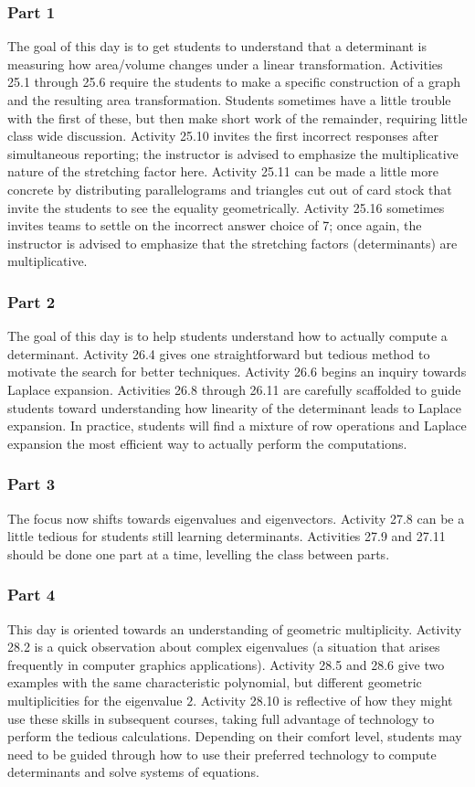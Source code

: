 \documentclass{article}
\begin{document}
\subsubsection*{Part 1}
The goal of this day is to get students to understand that a determinant is measuring how area/volume changes under a linear transformation.  Activities 25.1 through 25.6 require the students to make a specific construction of a graph and the resulting area transformation.  Students sometimes have a little trouble with the first of these, but then make short work of the remainder, requiring little class wide discussion.  Activity 25.10 invites the first incorrect responses after simultaneous reporting; the instructor is advised to emphasize the multiplicative nature of the stretching factor here.  Activity 25.11 can be made a little more concrete by distributing parallelograms and triangles cut out of card stock that invite the students to see the equality geometrically.  Activity 25.16 sometimes invites teams to settle on the incorrect answer choice of 7; once again, the instructor is advised to emphasize that the stretching factors (determinants) are multiplicative.

\subsubsection*{Part 2}
The goal of this day is to help students understand how to actually compute a determinant.  Activity 26.4 gives one straightforward but tedious method to motivate the search for better techniques.  Activity 26.6 begins an inquiry towards Laplace expansion.  Activities 26.8 through 26.11 are carefully scaffolded to guide students toward understanding how linearity of the determinant leads to Laplace expansion.  In practice, students will find a mixture of row operations and Laplace expansion the most efficient way to actually perform the computations.

\subsubsection*{Part 3}
The focus now shifts towards eigenvalues and eigenvectors.  Activity 27.8 can be a little tedious for students still learning determinants.  Activities 27.9 and 27.11 should be done one part at a time, levelling the class between parts.

\subsubsection*{Part 4}
This day is oriented towards an understanding of geometric multiplicity.  Activity 28.2 is a quick observation about complex eigenvalues (a situation that arises frequently in computer graphics applications).   Activity 28.5 and 28.6 give two examples with the same characteristic polynomial, but different geometric multiplicities for the eigenvalue $2$.  Activity 28.10 is reflective of how they might use these skills in subsequent courses, taking full advantage of technology to perform the tedious calculations.  Depending on their comfort level, students may need to be guided through how to use their preferred technology to compute determinants and solve systems of equations.
\end{document}
